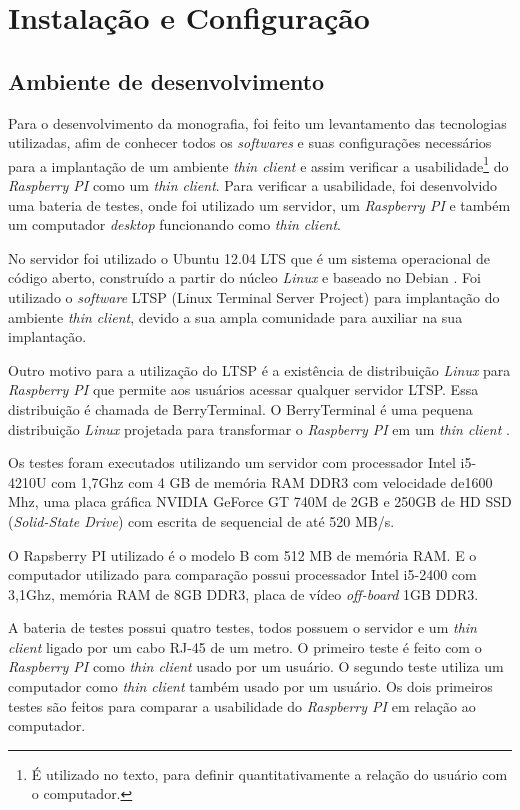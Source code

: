 \documentclass[
	12pt,				%
	openright,			%
	twoside,			%
	a4paper,			%
	chapter=TITLE,		%
	english,			%
	brazil				%
	]{abntex2}
\begin{document}
\chapter{Instalação e Configuração}

\section{Ambiente de desenvolvimento}
\label{AmbienteTest}
Para o desenvolvimento da monografia, foi feito um levantamento das tecnologias utilizadas, afim de conhecer todos os \textit{softwares} e suas configurações necessários para a implantação de um ambiente \textit{thin client} e assim verificar a usabilidade\footnote{ É utilizado no texto, para definir quantitativamente a relação do usuário com o computador.} do \textit{Raspberry PI} como um \textit{thin client}. Para verificar a usabilidade, foi desenvolvido uma bateria de testes, onde foi utilizado um servidor, um \textit{Raspberry PI} e também um computador \textit{desktop} funcionando como \textit{thin client}. 

No servidor foi utilizado o Ubuntu 12.04 LTS que é um sistema operacional de código aberto, construído a partir do núcleo \textit{Linux} e baseado no Debian \cite{ubuntu}. Foi utilizado o \textit{software} LTSP (Linux Terminal Server Project) para implantação do ambiente \textit{thin client}, devido a sua ampla comunidade para auxiliar na sua implantação. 

Outro motivo para a utilização do LTSP é a existência de distribuição \textit{Linux} para \textit{Raspberry PI} que permite aos usuários acessar qualquer servidor LTSP. Essa distribuição é chamada de BerryTerminal. O BerryTerminal é uma pequena distribuição \textit{Linux} projetada para transformar o \textit{Raspberry PI} em um \textit{thin client} \cite{berryterminal}.

Os testes foram executados utilizando um servidor com processador Intel i5-4210U com 1,7Ghz com 4 GB de memória RAM DDR3 com velocidade de1600 Mhz, uma placa gráfica NVIDIA GeForce GT 740M de 2GB e 250GB de HD SSD (\textit{Solid-State Drive}) com escrita de sequencial de até 520 MB/s.
	
O Rapsberry PI utilizado é o modelo B com 512 MB de memória RAM. E o computador utilizado para comparação possui processador Intel i5-2400 com 3,1Ghz, memória RAM de 8GB DDR3, placa de vídeo \textit{off-board} 1GB DDR3.

A bateria de testes possui quatro testes, todos possuem o servidor e um \textit{thin client} ligado por um cabo RJ-45 de um metro. O primeiro teste é feito com o \textit{Raspberry PI} como \textit{thin client} usado por um usuário.  O segundo teste utiliza um computador como \textit{thin client} também usado por um usuário. Os dois primeiros testes são feitos para comparar a usabilidade do \textit{Raspberry PI}  em relação ao computador. 
\end{document}
